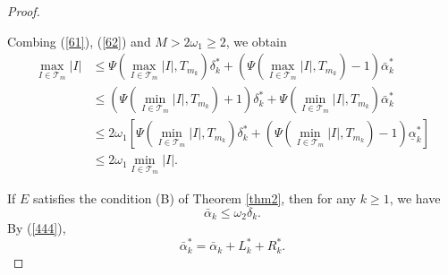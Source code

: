 \documentclass[reqno]{amsart}
\theoremstyle{plain}
\theoremstyle{definition}
\theoremstyle{remark}
\numberwithin{equation}{section} \DeclareMathOperator\intr{int}
\begin{document}
\begin{proof}
\begin{enumerate}
Combing (\ref{61}),  (\ref{62}) and $M>2\omega_{1}\ge2$, we obtain
\begin{equation}
\begin{aligned}
\max_{I\in\mathcal{T}_{m} }\left | I \right |&\le \Psi (\max_{I\in\mathcal{T}_{m} }\left | I \right |,T_{m_{k}})\delta^*_k+(\Psi (\max_{I\in\mathcal{T}_{m} }\left | I \right |,T_{m_{k}})-1)\bar{\alpha}^*_k\\ &\le (\Psi (\min_{I\in\mathcal{T}_{m} }\left | I \right |,T_{m_{k}})+1)\delta^*_k+\Psi (\min_{I\in\mathcal{T}_{m} }\left | I \right |,T_{m_{k}})\bar{\alpha}^*_k\\
&\le 2\omega_{1}[\Psi (\min_{I\in\mathcal{T}_{m} }\left | I \right |,T_{m_{k}})\delta^*_k+(\Psi (\min_{I\in\mathcal{T}_{m} }\left | I \right |,T_{m_{k}})-1)\underline{\alpha}^*_k]\\
&\le 2\omega_{1} \min_{I\in\mathcal{T}_{m} }\left | I \right |.\nonumber
\end{aligned}
\end{equation}

	\end{enumerate}

If  $E$ satisfies the condition (B) of Theorem \ref{thm2}, then for any $k\ge 1$, we have
\begin{equation}
\bar\alpha_k\le \omega_{2} \delta_k.\nonumber
\end{equation}
By (\ref{444}), \begin{equation}\label{64}
\bar{\alpha}^*_k=\bar{\alpha}_k+L^*_k+R^*_k.
\end{equation}


\end{proof}
\end{document}
